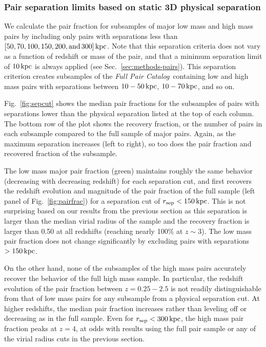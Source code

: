 \documentclass[linenumbers,twocolumn]{aastex631}
\newcommand{\paircat}{\textit{Full Pair Catalog}}
\begin{document}
\subsubsection{Pair separation limits based on static 3D physical separation} \label{sec:results-frac-sepcut}
    We calculate the pair fraction for subsamples of major low mass and high mass pairs by including only pairs with separations less than $[50,70,100,150,200,\mathrm{and\, }300]\mathrm{\,kpc}$.  
    Note that this separation criteria does not vary as a function of redshift or mass of the pair, and that a minimum separation limit of $10\mathrm{\,kpc}$ is always applied (see Sec.~\ref{sec:methods-pairs}).
    This separation criterion creates subsamples of the \paircat\ containing low and high mass pairs with separations between $10-50\mathrm{\,kpc}$, $10-70\mathrm{\,kpc}$, and so on. 

    Fig.~\ref{fig:sepcut} shows the median pair fractions for the subsamples of pairs with separations lower than the physical separation listed at the top of each column. 
    The bottom row of the plot shows the recovery fraction, or the number of pairs in each subsample compared to the full sample of major pairs. 
    Again, as the maximum separation increases (left to right), so too does the pair fraction and recovered fraction of the subsample. 
    
    The low mass major pair fraction (green) maintains roughly the same behavior (decreasing with decreasing redshift) for each separation cut, and first recovers the redshift evolution and magnitude of the pair fraction of the full sample (left panel of Fig.~\ref{fig:pairfrac}) for a separation cut of $r_{\mathrm{sep}} < 150\mathrm{\,kpc}$. 
    This is not surprising based on our results from the previous section as this separation is larger than the median virial radius of the sample and the recovery fraction is larger than 0.50 at all redshifts (reaching nearly 100\% at $z\sim3$).  
    The low mass pair fraction does not change significantly by excluding pairs with separations $>150\mathrm{\,kpc}$.

    On the other hand, none of the subsamples of the high mass pairs accurately recover the behavior of the full high mass sample. 
    In particular, the redshift evolution of the pair fraction between $z=0.25-2.5$ is not readily distinguishable from that of low mass pairs for any subsample from a physical separation cut.
    At higher redshifts, the median pair fraction increases rather than leveling off or decreasing as in the full sample.
    Even for $r_{\mathrm{sep}}<300\mathrm{\,kpc}$, the high mass pair fraction peaks at $z=4$, at odds with results using the full pair sample or any of the virial radius cuts in the previous section. 
\end{document}
